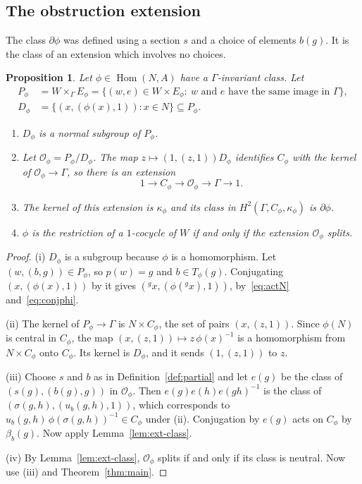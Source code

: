 \documentclass[12pt,letterpaper]{article}
\numberwithin{equation}{section}
\theoremstyle{plain}
\newtheorem{proposition}[theorem]{Proposition}
\theoremstyle{definition}
\newcommand{\act}[2]{{}^{#1}\!#2}          %
\DeclareMathOperator{\Hom}{Hom}
\begin{document}
\subsection{The obstruction extension}

The class $\partial\phi$ was defined using a section $s$ and a choice of
elements $b(g)$. It is the class of an extension which involves no
choices.

\begin{proposition}\label{prop:canonical}
Let $\phi\in\Hom(N,A)$ have a $\Gamma$-invariant class. Let
\begin{align*}
P_\phi&=W\times_\Gamma E_\phi=\{(w,e)\in W\times E_\phi:
\ w \text{ and } e \text{ have the same image in } \Gamma\},\\
D_\phi&=\{(x,(\phi(x),1)):x\in N\}\subseteq P_\phi .
\end{align*}
\begin{enumerate}[label=\textup{(\roman*)},itemsep=1pt]
\item $D_\phi$ is a normal subgroup of $P_\phi$.
\item Let $\mathcal{O}_\phi=P_\phi/D_\phi$. The map
$z\mapsto(1,(z,1))D_\phi$ identifies $C_\phi$ with the kernel of
$\mathcal{O}_\phi\to\Gamma$, so there is an extension
\[
1\longrightarrow C_\phi\longrightarrow\mathcal{O}_\phi\longrightarrow
\Gamma\longrightarrow1 .
\]
\item The kernel of this extension is $\kappa_\phi$ and its class in
$H^2(\Gamma,C_\phi,\kappa_\phi)$ is $\partial\phi$.
\item $\phi$ is the restriction of a $1$-cocycle of $W$ if and only if the
extension $\mathcal{O}_\phi$ splits.
\end{enumerate}
\end{proposition}

\begin{proof}
(i) $D_\phi$ is a subgroup because $\phi$ is a homomorphism. Let
$(w,(b,g))\in P_\phi$, so $p(w)=g$ and $b\in T_\phi(g)$. Conjugating
$(x,(\phi(x),1))$ by it gives $(\act{g}{x},(\phi(\act{g}{x}),1))$,
by~\eqref{eq:actN} and~\eqref{eq:conjphi}.

(ii) The kernel of $P_\phi\to\Gamma$ is $N\times C_\phi$, the set of pairs
$(x,(z,1))$. Since $\phi(N)$ is central in $C_\phi$, the map
$(x,(z,1))\mapsto z\,\phi(x)^{-1}$ is a homomorphism from $N\times C_\phi$
onto $C_\phi$. Its kernel is $D_\phi$, and it sends $(1,(z,1))$ to $z$.

(iii) Choose $s$ and $b$ as in Definition~\ref{def:partial} and let
$e(g)$ be the class of $(s(g),(b(g),g))$ in $\mathcal{O}_\phi$. Then
$e(g)e(h)e(gh)^{-1}$ is the class of $(\sigma(g,h),(u_b(g,h),1))$, which
corresponds to $u_b(g,h)\,\phi(\sigma(g,h))^{-1}\in C_\phi$ under (ii).
Conjugation by $e(g)$ acts on $C_\phi$ by $\beta_b(g)$. Now apply
Lemma~\ref{lem:ext-class}.

(iv) By Lemma~\ref{lem:ext-class}, $\mathcal{O}_\phi$ splits if and only
if its class is neutral. Now use (iii) and Theorem~\ref{thm:main}.
\end{proof}
\end{document}
